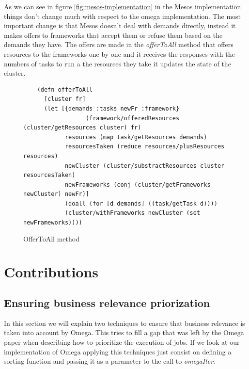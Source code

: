 \documentclass{report}                     %
\begin{document}
As we can see in figure \ref{fig:mesos-implementation} in the Mesos
implementation things don't change much with respect to the omega
implementation. The most important change is that Mesos doesn't deal
with demands directly, instead it makes offers to frameworks that
accept them or refuse them based on the demands they have. The offers
are made in the \emph{offerToAll} method that offers resources to the
frameworks one by one and it receives the responses with the numbers
of tasks to run a the resources they take it updates the state of the
cluster.

\begin{figure}[!ht]
\centering
\begin{verbatim}
    (defn offerToAll
      [cluster fr]
      (let [{demands :tasks newFr :framework}
                  (framework/offeredResources (cluster/getResources cluster) fr)
            resources (map task/getResources demands)
            resourcesTaken (reduce resources/plusResources resources)
            newCluster (cluster/substractResources cluster resourcesTaken)
            newFrameworks (conj (cluster/getFrameworks newCluster) newFr)]
            (doall (for [d demands] ((task/getTask d))))
            (cluster/withFrameworks newCluster (set newFrameworks))))

\end{verbatim}

\caption{OfferToAll method}
\label{fig:mesos-offerToAll}
\end{figure}

\chapter{Contributions}

\section{Ensuring business relevance priorization}

In this section we will explain two techniques to ensure that business
relevance is taken into account by Omega. This tries to fill a gap
that was left by the Omega paper when describing how to prioritize the
execution of jobs. If we look at our implementation of Omega applying
this techniques just consist on defining a sorting function and
passing it as a parameter to the call to \emph{omegaIter}.
\end{document}
